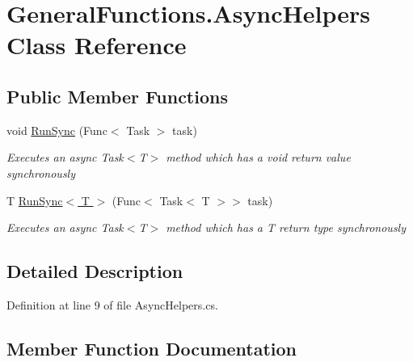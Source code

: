 \hypertarget{class_general_functions_1_1_async_helpers}{}\section{General\+Functions.\+Async\+Helpers Class Reference}
\label{class_general_functions_1_1_async_helpers}
\subsection*{Public Member Functions}
\begin{DoxyCompactItemize}
\item 
void \hyperlink{class_general_functions_1_1_async_helpers_a1c9a89f4892028dd40a70752105b3f97}{Run\+Sync} (Func$<$ Task $>$ task)
\begin{DoxyCompactList}\small\item\em Execute\textquotesingle{}s an async Task$<$\+T$>$ method which has a void return value synchronously \end{DoxyCompactList}\item 
T \hyperlink{class_general_functions_1_1_async_helpers_ae84f4401c29817870b9a72ffbcfb41e5}{Run\+Sync$<$ T $>$} (Func$<$ Task$<$ T $>$$>$ task)
\begin{DoxyCompactList}\small\item\em Execute\textquotesingle{}s an async Task$<$\+T$>$ method which has a T return type synchronously \end{DoxyCompactList}\end{DoxyCompactItemize}


\subsection{Detailed Description}


Definition at line 9 of file Async\+Helpers.\+cs.



\subsection{Member Function Documentation}
\hypertarget{class_general_functions_1_1_async_helpers_a1c9a89f4892028dd40a70752105b3f97}{}\label{class_general_functions_1_1_async_helpers_a1c9a89f4892028dd40a70752105b3f97} 
